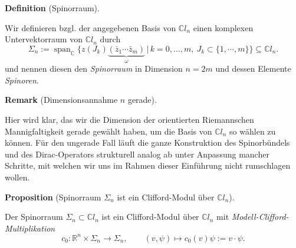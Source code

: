 \documentclass[10pt, letterpaper]{article}
\newcommand{\R}{\mathbb{R}}
\newcommand{\C}{\mathbb{C}}
\newcommand{\CustomHeading}[3]{%
  \par\medskip\noindent%
  \textbf{#1 #2} \textnormal{(#3)}.\enskip%
}
\newenvironment{DEF}[2]{\CustomHeading{Definition}{#1}{#2}}{}
\newenvironment{PROP}[2]{\CustomHeading{Proposition}{#1}{#2}}{}
\newenvironment{REM}[2]{\CustomHeading{Remark}{#1}{#2}}{}
\begin{document}
\begin{DEF}{}{Spinorraum}
Wir definieren bzgl. der angegebenen Basis von $\C l_n$ einen komplexen Untervektorraum von $\C l_n$ durch
\[
\Sigma_n:=
\operatorname{span}_{\C}\bigl\{
z(J_k)\underbrace{(\bar z_1\cdots \bar z_m)}_{\omega}\,\big|\,
k=0,\dots,m,\ J_k \subset \{1,\cdots,m\}
\bigr\}
\subseteq \C l_n.
\]
und nennen diesen den \emph{Spinorraum} in Dimension $n=2m$ und dessen Elemente \emph{Spinoren}.
\end{DEF}


\begin{REM}{}{Dimensionsannahme $n$ gerade}
Hier wird klar, das wir die Dimension der orientierten Riemannschen Mannigfaltigkeit gerade gewählt haben, um die Basis von $\C l_n$ so wählen zu können. Für den ungerade Fall läuft die ganze Konstruktion des Spinorbündels und des Dirac-Operators strukturell analog ab unter Anpassung mancher Schritte, mit welchen wir uns im Rahmen dieser Einführung nicht rumschlagen wollen.    
\end{REM}



\begin{PROP}{}{Spinorraum $\Sigma_n$ ist ein Clifford-Modul über $\C l_n$}
Der Spinorraum $\Sigma_n\subset \C l_n$ ist ein Clifford-Modul über $\C l_n$ mit 
\emph{Modell-Clifford-Multiplikation}
\[
c_0:\R^n\times \Sigma_n\longrightarrow \Sigma_n,
\qquad
(v,\psi)\longmapsto c_0(v)\psi:=v \cdot\psi.
\]
\end{PROP}
\end{document}
